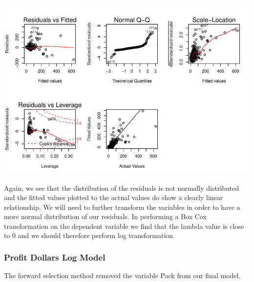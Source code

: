\documentclass[]{elsarticle} %
\makeatletter
\def\maxwidth{\ifdim\Gin@nat@width>\linewidth\linewidth
\else\Gin@nat@width\fi}
\let\Oldincludegraphics\includegraphics
\renewcommand{\includegraphics}[1]{\Oldincludegraphics[width=\maxwidth]{#1}}
\makeatother
\begin{document}
\includegraphics{Final_Project_files/figure-latex/unnamed-chunk-19-1.pdf}

Again, we see that the distribution of the residuals is not normally
distributed and the fitted values plotted to the actual values do show a
clearly linear relationship. We will need to further transform the
variables in order to have a more normal distribution of our residuals.
In performing a Box Cox transformation on the dependent variable we find
that the lambda value is close to 0 and we should therefore perform log
transformation.

\subsubsection{Profit Dollars Log Model}\label{profit-dollars-log-model}

The forward selection method removed the variable Pack from our final
model.
\end{document}
